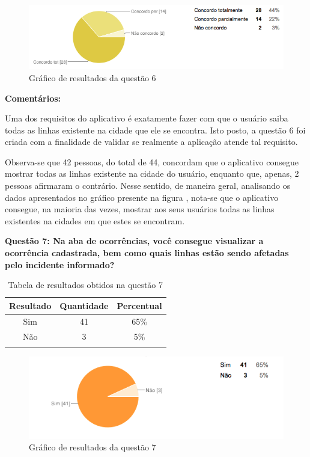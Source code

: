 \begin{figure}[h]
\begin{center}
  \includegraphics[width=16cm]{images/graficos/questao6.png}
  \caption{Gráfico de resultados da questão 6}
  \label{fig:questao6}
\end{center}
\end{figure}

\textbf{Comentários:}

Uma dos requisitos do aplicativo é exatamente fazer com que o usuário saiba todas as linhas existente na cidade que ele se encontra. Isto posto, a questão 6 foi criada com a finalidade de validar se realmente a aplicação atende tal requisito. 
	
Observa-se que 42 pessoas, do total de 44, concordam que o aplicativo consegue mostrar todas as linhas existente na cidade do usuário, enquanto que, apenas, 2 pessoas afirmaram o contrário. Nesse sentido, de maneira geral, analisando os dados apresentados no gráfico presente na figura , nota-se que o aplicativo consegue, na maioria das vezes, mostrar aos seus usuários todas as linhas existentes na cidades em que estes se encontram.\newline

\textbf{Questão 7: Na aba de ocorrências, você consegue visualizar a ocorrência cadastrada, bem como quais linhas estão sendo afetadas pelo incidente informado?}

\begin{center}
\begin{longtable}{c|c|c}
\hline
    \multicolumn{1}{c}{\textbf{Resultado}} & \multicolumn{1}{c}{\textbf{Quantidade}} & \multicolumn{1}{c}{\textbf{Percentual}} \\
\hline
    Sim & 41 &  65\%\\
    \hline
    Não & 3 & 5\%\\
    \hline
\caption{Tabela de resultados obtidos na questão 7}
\label{tabq7}
\end{longtable}
\end{center}


\begin{figure}[h]
\begin{center}
  \includegraphics[width=16cm]{images/graficos/questao7.png}
  \caption{Gráfico de resultados da questão 7}
  \label{fig:questao7}
\end{center}
\end{figure}

